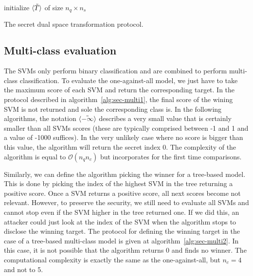 \begin{center}
\begin{algorithm}[H]
\DontPrintSemicolon
initialize $\langle \tilde{T} \rangle$ of size $n_q \times n_s$ \;
\caption{The secret dual space transformation protocol.}
\label{alg:sec-rbfsvm}
\end{algorithm}
\end{center}

\subsection{Multi-class evaluation}
The SVMs only perform binary classification and are combined to perform multi-class classification. To evaluate the one-against-all model, we just have to take the maximum score of each SVM and return the corresponding target. In the protocol described in algorithm~\ref{alg:sec-multi1}, the final score of the wining SVM is not returned and sole the corresponding class is. In the following algorithms, the notation $\langle \tilde{-\infty} \rangle$ describes a very small value that is certainly smaller than all SVMs scores (these are typically comprised between -1 and 1 and a value of -1000 suffices). In the very unlikely case where no score is bigger than this value, the algorithm will return the secret index 0. The complexity of the algorithm is equal to $\mathcal{O}(n_qn_c)$ but incorporates for the first time comparisons.

Similarly, we can define the algorithm picking the winner for a tree-based model. This is done by picking the index of the highest SVM in the tree returning a positive score. Once a SVM returns a positive score, all next scores become not relevant. However, to preserve the security, we still need to evaluate all SVMs and cannot stop even if the SVM higher in the tree returned one. If we did this, an attacker could just look at the index of the SVM when the algorithm stops to disclose the winning target. The protocol for defining the winning target in the case of a tree-based multi-class model is given at algorithm~\ref{alg:sec-multi2}. In this case, it is not possible that the algorithm returns 0 and finds no winner. The computational complexity is exactly the same as the one-against-all, but $n_c = 4$ and not to 5.

